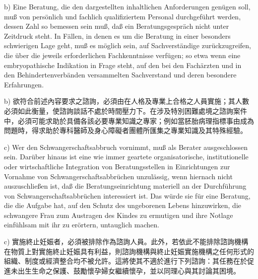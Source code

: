 \documentclass[12pt]{article}
\begin{document}
\begin{sourcepara}[title={原文D.125}]
b) Eine Beratung, die den dargestellten inhaltlichen Anforderungen genügen soll, muß von persönlich und fachlich qualifiziertem Personal durchgeführt werden, dessen Zahl so bemessen sein muß, daß ein Beratungsgespräch nicht unter Zeitdruck steht. In Fällen, in denen es um die Beratung in einer besonders schwierigen Lage geht, muß es möglich sein, auf Sachverständige zurückzugreifen, die über die jeweils erforderlichen Fachkenntnisse verfügen; so etwa wenn eine embryopathische Indikation in Frage steht, auf den bei den Fachärzten und in den Behindertenverbänden versammelten Sachverstand und deren besondere Erfahrungen.
\end{sourcepara}
\begin{transpara}
b) 欲符合前述內容要求之諮詢，必須由在人格及專業上合格之人員實施；其人數必須如此衡量，使諮詢談話不處於時間壓力下。在涉及特別困難處境之諮詢案件中，必須可能求助於具備各該必要專業知識之專家；例如當胚胎病理指標事由成為問題時，得求助於專科醫師及身心障礙者團體所匯集之專業知識及其特殊經驗。
\end{transpara}

\begin{sourcepara}[title={原文D.126}]
c) Wer den Schwangerschaftsabbruch vornimmt, muß als Berater ausgeschlossen sein. Darüber hinaus ist eine wie immer geartete organisatorische, institutionelle oder wirtschaftliche Integration von Beratungsstellen in Einrichtungen zur Vornahme von Schwangerschaftsabbrüchen unzulässig, wenn hiernach nicht auszuschließen ist, daß die Beratungseinrichtung materiell an der Durchführung von Schwangerschaftsabbrüchen interessiert ist. Das würde sie für eine Beratung, die die Aufgabe hat, auf den Schutz des ungeborenen Lebens hinzuwirken, die schwangere Frau zum Austragen des Kindes zu ermutigen und ihre Notlage einfühlsam mit ihr zu erörtern, untauglich machen.
\end{sourcepara}
\begin{transpara}
c) 實施終止妊娠者，必須被排除作為諮詢人員。此外，若依此不能排除諮詢機構在物質上對實施終止妊娠具有利益，則諮詢機構與終止妊娠實施機構之任何形式的組織、制度或經濟整合均不被允許。這將使其不適於進行下列諮詢：其任務在於促進未出生生命之保護、鼓勵懷孕婦女繼續懷孕，並以同理心與其討論其困境。
\end{transpara}
\end{document}
